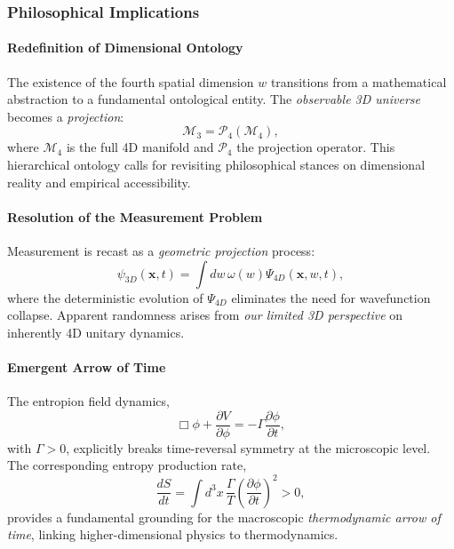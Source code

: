 \documentclass[12pt]{article}
\begin{document}
\subsubsection*{Philosophical Implications}

\paragraph{Redefinition of Dimensional Ontology}

The existence of the fourth spatial dimension \(w\) transitions from a mathematical abstraction to a fundamental ontological entity. The \emph{observable 3D universe} becomes a \emph{projection}:
\begin{equation}
\mathcal{M}_3 = \mathcal{P}_4(\mathcal{M}_4),
\label{eq:projection_of_manifold}
\end{equation}
where \(\mathcal{M}_4\) is the full 4D manifold and \(\mathcal{P}_4\) the projection operator. This hierarchical ontology calls for revisiting philosophical stances on dimensional reality and empirical accessibility.

\paragraph{Resolution of the Measurement Problem}

Measurement is recast as a \emph{geometric projection} process:
\begin{equation}
\psi_{3D}(\mathbf{x}, t) = \int dw \, \omega(w) \Psi_{4D}(\mathbf{x}, w, t),
\label{eq:measurement_projection}
\end{equation}
where the deterministic evolution of \(\Psi_{4D}\) eliminates the need for wavefunction collapse. Apparent randomness arises from \emph{our limited 3D perspective} on inherently 4D unitary dynamics.

\paragraph{Emergent Arrow of Time}

The entropion field dynamics,
\begin{equation}
\Box \phi + \frac{\partial V}{\partial \phi} = -\Gamma \frac{\partial \phi}{\partial t},
\label{eq:entropion_dissipative}
\end{equation}
with \(\Gamma > 0\), explicitly breaks time-reversal symmetry at the microscopic level. The corresponding entropy production rate,
\begin{equation}
\frac{dS}{dt} = \int d^3x \, \frac{\Gamma}{T} \left(\frac{\partial \phi}{\partial t}\right)^2 > 0,
\label{eq:entropy_production_rate}
\end{equation}
provides a fundamental grounding for the macroscopic \emph{thermodynamic arrow of time}, linking higher-dimensional physics to thermodynamics.
\end{document}
